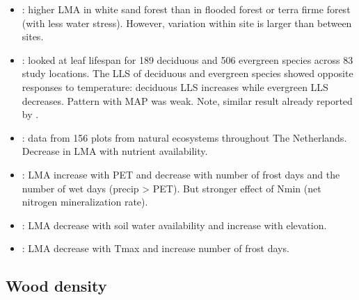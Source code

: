 \documentclass[a4paper,11pt]{article}
\begin{document}
\begin{itemize}
\item \citet{Fortunel-2014}: higher LMA  in white sand forest than in flooded forest or terra firme forest (with less water stress). However, variation within site is larger than between sites.

\item \citet{vanOmmenKloeke-2012}: looked at leaf lifespan for 189 deciduous and 506 evergreen species across 83 study locations. The LLS of deciduous and evergreen species showed opposite responses to temperature: deciduous LLS increases while evergreen LLS decreases. Pattern with MAP was weak. Note, similar result already reported by \citet{Wright-2005}.

\item \citet{Douma-2011}: data from 156 plots from natural ecosystems throughout The Netherlands.  Decrease in LMA with nutrient availability.

\item \citet{VanBodegom-2014}: LMA increase with PET and decrease with number of frost days and the number of wet days (precip > PET). But stronger effect of Nmin (net nitrogen mineralization rate).

\item \citet{Cornwell-2009}: LMA decrease with soil water availability and increase with elevation.

\item \citet{Maire-2015}: LMA decrease with Tmax and increase number of frost days.
\end{itemize}

\subsection{Wood density}
\end{document}

